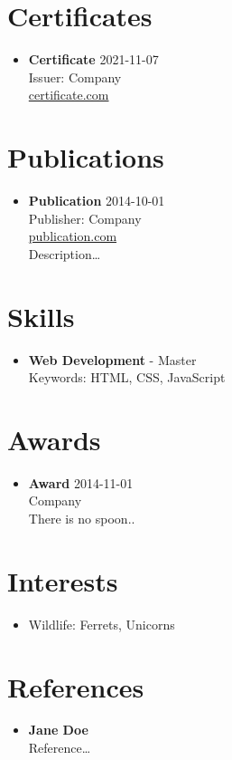 \documentclass{article}
\begin{document}
\section*{Certificates}
\begin{itemize}[leftmargin=*]
		
	\item \textbf{Certificate} \hfill 2021-11-07 \\
	Issuer: Company \\
	\href{https://certificate.com}{certificate.com}
				
\end{itemize}
		

\section*{Publications}
\begin{itemize}[leftmargin=*]
		
	\item \textbf{Publication} \hfill 2014-10-01 \\
	Publisher: Company \\
	\href{https://publication.com}{publication.com} \\
	Description…
				
\end{itemize}
		

\section*{Skills}
\begin{itemize}[leftmargin=*]
		
	\item \textbf{Web Development} - Master \\
				Keywords: HTML, CSS, JavaScript
\end{itemize}
		

\section*{Awards}
\begin{itemize}[leftmargin=*]
		
	\item \textbf{Award} \hfill 2014-11-01\\
	Company \\
	There is no spoon..
				
\end{itemize}
		

\section*{Interests}
\begin{itemize}[leftmargin=*]
		\item Wildlife: Ferrets, Unicorns
\end{itemize}
		

\section*{References}
\begin{itemize}[leftmargin=*]
		
	\item \textbf{Jane Doe} \\
	Reference…	

				
\end{itemize}
		
\end{document}

